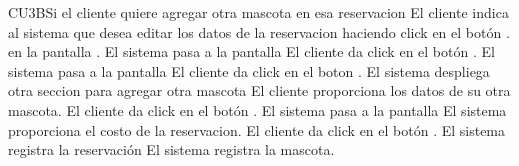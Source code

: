 \begin{UCtrayectoriaA}{CU3}{B}{Si el cliente quiere agregar otra mascota en esa reservacion}
	\UCpaso[] El cliente indica al sistema que desea editar los datos de la reservacion haciendo click en el botón . en la pantalla .
	\UCpaso []El sistema pasa a la pantalla 
	\UCpaso []El cliente da click en el botón .
	\UCpaso []El sistema pasa a la pantalla 
	\UCpaso []El cliente da click en el boton .
	\UCpaso []El sistema despliega otra seccion para agregar otra mascota 
	\UCpaso []El cliente proporciona los datos de su otra mascota.
	\UCpaso []El cliente da click en el botón .
	\UCpaso []El sistema pasa a la pantalla 
	\UCpaso []El sistema proporciona el costo de la reservacion.
	\UCpaso []El cliente da click en el botón .
	\UCpaso []El sistema registra la reservación
	\UCpaso []El sistema registra la mascota.
\end{UCtrayectoriaA}








